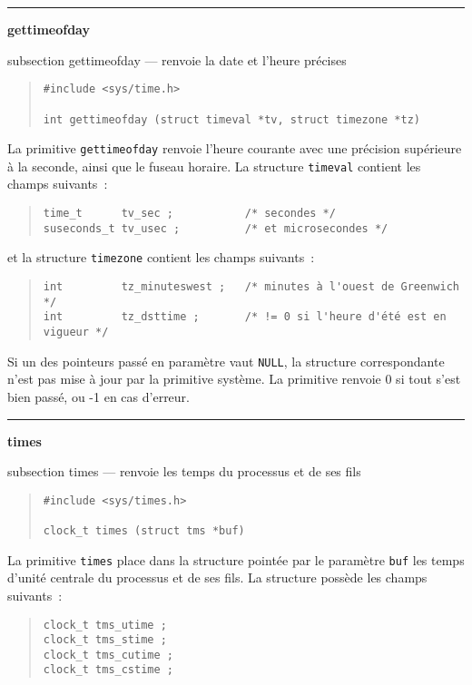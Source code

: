 \documentclass [twoside] {report}
\newcommand {\primitive} [1]
    {
	\phantomsection
	{\large \bf #1}
	\addcontentsline {toc} {subsection} {#1}
    }
\newcommand {\separation}
    {
	\vspace {5mm}
	\nopagebreak
	\hrule
    }
\begin{document}
\separation
\primitive {gettimeofday} --- renvoie la date et l'heure précises
    \label {gettimeofday}

\begin {quote}
\begin {verbatim}
#include <sys/time.h>

int gettimeofday (struct timeval *tv, struct timezone *tz)
\end{verbatim}
\end {quote}


La primitive \texttt {gettimeofday} renvoie l'heure courante avec une
précision supérieure à la seconde, ainsi que le fuseau horaire. La
structure \texttt {timeval} contient les champs suivants~:
\begin {quote}
\begin {verbatim}
time_t      tv_sec ;           /* secondes */
suseconds_t tv_usec ;          /* et microsecondes */
\end{verbatim}
\end {quote}
et la structure \texttt {timezone} contient les champs suivants~:
\begin {quote}
\begin {verbatim}
int         tz_minuteswest ;   /* minutes à l'ouest de Greenwich */
int         tz_dsttime ;       /* != 0 si l'heure d'été est en vigueur */
\end{verbatim}
\end {quote}

Si un des pointeurs passé en paramètre vaut \texttt {NULL}, la structure
correspondante n'est pas mise à jour par la primitive système. La
primitive renvoie 0 si tout s'est bien passé, ou -1 en cas d'erreur.


\separation
\primitive {times} --- renvoie les temps du processus et de ses fils

\begin {quote}
\begin {verbatim}
#include <sys/times.h>

clock_t times (struct tms *buf)
\end{verbatim}
\end {quote}

La primitive {\tt times} place dans la structure pointée par le
paramètre \texttt {buf} les temps d'unité centrale du processus et de
ses fils. La structure possède les champs suivants~:

\begin {quote}
\begin {verbatim}
clock_t tms_utime ;
clock_t tms_stime ;
clock_t tms_cutime ;
clock_t tms_cstime ;
\end{verbatim}
\end {quote}
\end{document}
